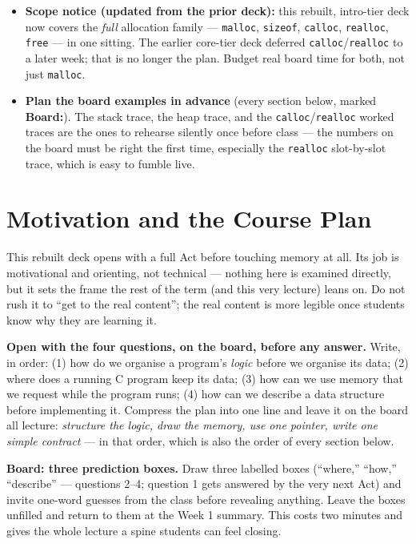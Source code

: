 \documentclass[11pt]{article}
\begin{document}
\begin{itemize}
  \item \textbf{Scope notice (updated from the prior deck):} this rebuilt, intro-tier deck now covers the \emph{full} allocation family --- \texttt{malloc}, \texttt{sizeof}, \texttt{calloc}, \texttt{realloc}, \texttt{free} --- in one sitting. The earlier core-tier deck deferred \texttt{calloc}/\texttt{realloc} to a later week; that is no longer the plan. Budget real board time for both, not just \texttt{malloc}.
  \item \textbf{Plan the board examples in advance} (every section below, marked \textbf{Board:}). The stack trace, the heap trace, and the \texttt{calloc}/\texttt{realloc} worked traces are the ones to rehearse silently once before class --- the numbers on the board must be right the first time, especially the \texttt{realloc} slot-by-slot trace, which is easy to fumble live.
\end{itemize}
\endgroup

\section{Motivation and the Course Plan}
\label{sec:act0}

This rebuilt deck opens with a full Act before touching memory at all. Its job is motivational and orienting, not technical --- nothing here is examined directly, but it sets the frame the rest of the term (and this very lecture) leans on. Do not rush it to ``get to the real content''; the real content is more legible once students know why they are learning it.

\textbf{Open with the four questions, on the board, before any answer.} Write, in order: (1) how do we organise a program's \emph{logic} before we organise its data; (2) where does a running C program keep its data; (3) how can we use memory that we request while the program runs; (4) how can we describe a data structure before implementing it. Compress the plan into one line and leave it on the board all lecture: \emph{structure the logic, draw the memory, use one pointer, write one simple contract} --- in that order, which is also the order of every section below.

\textbf{Board: three prediction boxes.} Draw three labelled boxes (``where,'' ``how,'' ``describe'' --- questions 2--4; question 1 gets answered by the very next Act) and invite one-word guesses from the class before revealing anything. Leave the boxes unfilled and return to them at the Week 1 summary. This costs two minutes and gives the whole lecture a spine students can feel closing.
\end{document}

